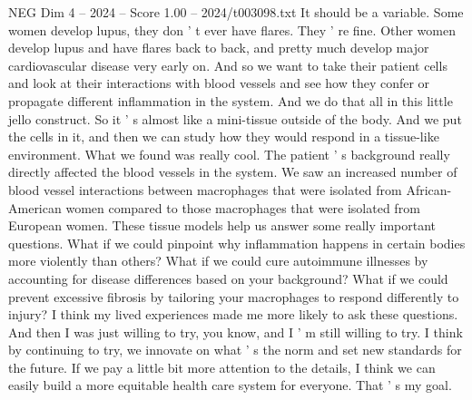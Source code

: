 \begin{textsample}{NEG Dim 4 – 2024 – Score 1.00 – 2024/t003098.txt}
It should be a variable.
Some women develop lupus, they don ' t ever have flares.
They ' re fine.
Other women develop lupus and have flares back to back, and pretty much develop major cardiovascular disease very early on.
And so we want to take their patient cells and look at their interactions with blood vessels and see how they confer or propagate different inflammation in the system.
And we do that all in this little jello construct.
So it ' s almost like a mini-tissue outside of the body.
And we put the cells in it, and then we can study how they would respond in a tissue-like environment.
What we found was really cool.
The patient ' s background really directly affected the blood vessels in the system.
We saw an increased number of blood vessel interactions between macrophages that were isolated from African-American women compared to those macrophages that were isolated from European women.
These tissue models help us answer some really important questions.
What if we could pinpoint why inflammation happens in certain bodies more violently than others?
What if we could cure autoimmune illnesses by accounting for disease differences based on your background?
What if we could prevent excessive fibrosis by tailoring your macrophages to respond differently to injury?
I think my lived experiences made me more likely to ask these questions.
And then I was just willing to try, you know, and I ' m still willing to try.
I think by continuing to try, we innovate on what ' s the norm and set new standards for the future.
If we pay a little bit more attention to the details, I think we can easily build a more equitable health care system for everyone.
That ' s my goal.

\end{textsample}

